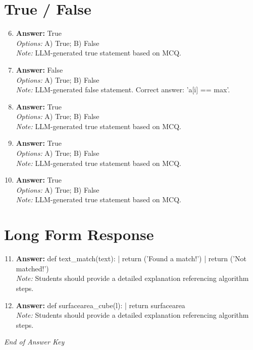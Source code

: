 \documentclass[12pt]{article}
\begin{document}
\section*{True / False}
\begin{enumerate}[label=\arabic*.]
\setcounter{enumi}{5}
\item \textbf{Answer:} True
\\ \textit{Options:} A) True; B) False
\\ \textit{Note:} LLM-generated true statement based on MCQ.
\item \textbf{Answer:} False
\\ \textit{Options:} A) True; B) False
\\ \textit{Note:} LLM-generated false statement. Correct answer: 'a[i] == max'.
\item \textbf{Answer:} True
\\ \textit{Options:} A) True; B) False
\\ \textit{Note:} LLM-generated true statement based on MCQ.
\item \textbf{Answer:} True
\\ \textit{Options:} A) True; B) False
\\ \textit{Note:} LLM-generated true statement based on MCQ.
\item \textbf{Answer:} True
\\ \textit{Options:} A) True; B) False
\\ \textit{Note:} LLM-generated true statement based on MCQ.
\end{enumerate}

\section*{Long Form Response}
\begin{enumerate}[label=\arabic*.]
\setcounter{enumi}{10}
\item \textbf{Answer:} def text\_match(text): | return ('Found a match!') | return ('Not matched!')
\\ \textit{Note:} Students should provide a detailed explanation referencing algorithm steps.
\item \textbf{Answer:} def surfacearea\_cube(l): | return surfacearea
\\ \textit{Note:} Students should provide a detailed explanation referencing algorithm steps.
\end{enumerate}

\vfill
\noindent\textit{End of Answer Key}
\end{document}
